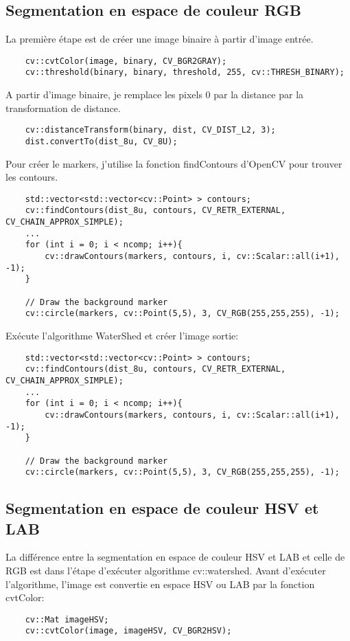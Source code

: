 \documentclass[article=a4, fontsize=11pt]{scrartcl}	%
\begin{document}
\subsection{Segmentation en espace de couleur RGB}
La première étape est de créer une image binaire à partir d'image entrée.
\begin{lstlisting}
    cv::cvtColor(image, binary, CV_BGR2GRAY);
    cv::threshold(binary, binary, threshold, 255, cv::THRESH_BINARY);
\end{lstlisting}
A partir d'image binaire, je remplace les pixels 0 par la distance par la transformation de distance.
\begin{lstlisting}
	cv::distanceTransform(binary, dist, CV_DIST_L2, 3);
	dist.convertTo(dist_8u, CV_8U);
\end{lstlisting}
Pour créer le markers, j'utilise la fonction findContours d'OpenCV pour trouver les contours.
\begin{lstlisting}
    std::vector<std::vector<cv::Point> > contours;
    cv::findContours(dist_8u, contours, CV_RETR_EXTERNAL, CV_CHAIN_APPROX_SIMPLE);
    ...
    for (int i = 0; i < ncomp; i++){
        cv::drawContours(markers, contours, i, cv::Scalar::all(i+1), -1);
    }

    // Draw the background marker
    cv::circle(markers, cv::Point(5,5), 3, CV_RGB(255,255,255), -1);    
\end{lstlisting}
Exécute l'algorithme WaterShed et créer l'image sortie:
\begin{lstlisting}
    std::vector<std::vector<cv::Point> > contours;
    cv::findContours(dist_8u, contours, CV_RETR_EXTERNAL, CV_CHAIN_APPROX_SIMPLE);
    ...
    for (int i = 0; i < ncomp; i++){
        cv::drawContours(markers, contours, i, cv::Scalar::all(i+1), -1);
    }

    // Draw the background marker
    cv::circle(markers, cv::Point(5,5), 3, CV_RGB(255,255,255), -1); 
\end{lstlisting}
\subsection{Segmentation en espace de couleur HSV et LAB}
La différence entre la segmentation en espace de couleur HSV et LAB et celle de RGB est dans l'étape d'exécuter algorithme cv::watershed. Avant d'exécuter l'algorithme, l'image est convertie en espace HSV ou LAB par la fonction cvtColor:
\begin{lstlisting}
    cv::Mat imageHSV;
    cv::cvtColor(image, imageHSV, CV_BGR2HSV);
\end{lstlisting}
\end{document}
